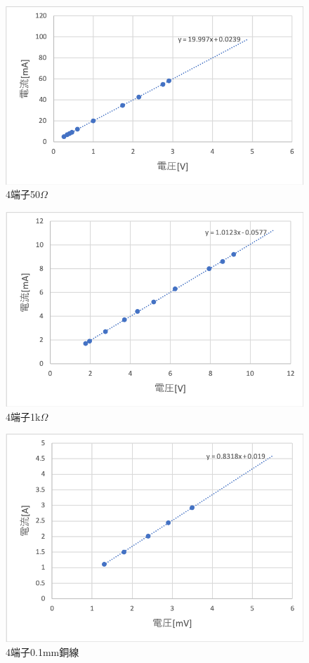 \documentclass[11pt, a4paper,twocolumn]{jarticle}
\begin{document}
\begin{figure}[htbp]
 \begin{center}
  \includegraphics[width=0.8\linewidth]{fig3.png}
 \end{center}
 \caption{4端子50$\Omega$}
 \label{fig:3}
\end{figure}

\begin{figure}[htbp]
 \begin{center}
  \includegraphics[width=0.8\linewidth]{fig5.png}
 \end{center}
 \caption{4端子1k$\Omega$}
 \label{fig:5}
\end{figure}

\begin{figure}[htbp]
 \begin{center}
  \includegraphics[width=0.8\linewidth]{fig6.png}
 \end{center}
 \caption{4端子0.1mm銅線}
 \label{fig:6}
\end{figure}
\end{document}
